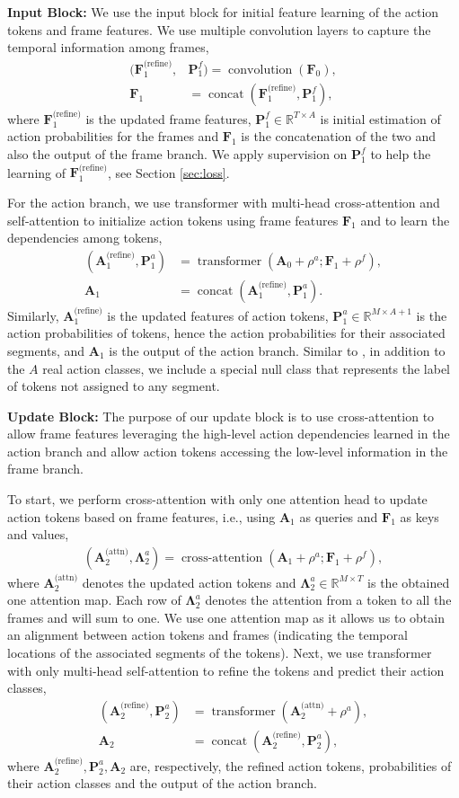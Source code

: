 \documentclass[10pt,twocolumn,letterpaper]{article}
\newcommand{\headline}[1]{\noindent \textbf{#1}}
\newcommand{\A}{\mathbf{A}}
\newcommand{\F}{\mathbf{F}}
\newcommand{\Prob}{\mathbf{P}}
\newcommand{\mR}{\mathbb{R}}
\newcommand{\LM}{\mathbf{\Lambda}}
\newcommand{\attn}{\text{(attn)}}
\newcommand{\refine}{\text{(refine)}}
\renewcommand{\Re}{\mathbb{R}}
\newcommand{\0}{\boldsymbol{0}}
\newcommand{\conv}{\operatorname{convolution}}
\newcommand{\tran}{\operatorname{transformer}}
\newcommand{\conc}{\operatorname{concat}}
\newcommand{\catt}{\operatorname{cross-attention}}
\begin{document}
\headline{Input Block:} We use the input block for initial feature learning of the action tokens and frame features.
We use multiple convolution layers to capture the temporal information among frames,
\begin{align}
(\F^{\refine}_1, &\Prob_1^f) = \conv(\F_0), \\
 \F_1 &= \conc(\F^{\refine}_1, \Prob_1^f),
\end{align}
where $\F^{\refine}_1$ is the updated frame features, $\Prob^f_1 \in \Re^{T \times A}$ is initial estimation of action probabilities for the frames and $\F_1$ is the concatenation of the two and also the output of the frame branch. 
We apply supervision on $\Prob^f_1$ to help the learning of $\F^{\refine}_1$, see Section \ref{sec:loss}. 

For the action branch, we use transformer with multi-head cross-attention and self-attention to initialize action tokens using frame features $\F_1$ and to learn the dependencies among tokens,
\begin{align}
(\A^\refine_1, \Prob^a_1) &= \tran(\A_0 + \rho^a; \F_1 + \rho^f), \\ 
\A_1 &= \conc(\A^\refine_1, \Prob_1^a).
\end{align}
Similarly, $\A^\refine_1$ is the updated features of action tokens, $\Prob^a_1 \in \mathbb{R}^{M \times A+1}$ is the action probabilities of tokens, hence the action probabilities for their associated segments, and $\A_1$ is the output of the action branch. Similar to \cite{Carion:CoRR20}, in addition to the $A$ real action classes, we include a special null class that represents the label of tokens not assigned to any segment. 


\headline{Update Block:} 
The purpose of our update block is to use cross-attention to allow frame features leveraging the high-level action dependencies learned in the action branch and allow action tokens accessing the low-level information in the frame branch. 

To start, we perform cross-attention with only one attention head to update action tokens based on frame features, i.e., using $\A_1$ as queries and $\F_1$ as keys and values,
\begin{align}
(\A^\attn_2, \mathbf{\Lambda}^a_2) = \catt(\A_1 + \rho^a; \F_1 + \rho^f),
\label{eq:f2a}
\end{align}
where $\A^\attn_2$ denotes the updated action tokens and $\LM^a_2 \in \mR^{M \times T}$ is the obtained one attention map. Each row of $\LM^a_2$ denotes the attention from a token to all the frames and will sum to one.
We use one attention map as it allows us to obtain an alignment between action tokens and frames (indicating the temporal locations of the associated segments of the tokens). Next, we use transformer with only multi-head self-attention to refine the tokens and predict their action classes, 
\begin{align}
(\A^\refine_2, \Prob^a_2) &= \tran(\A^\attn_2 + \rho^a), \\
 \A_2 &= \conc(\A^\refine_2, \Prob^a_2), 
\label{eq:a-update}
\end{align}
where $\A^\refine_2, \Prob^a_2, \A_2$ are, respectively, the refined action tokens, probabilities of their action classes and the output of the action branch.
\end{document}
